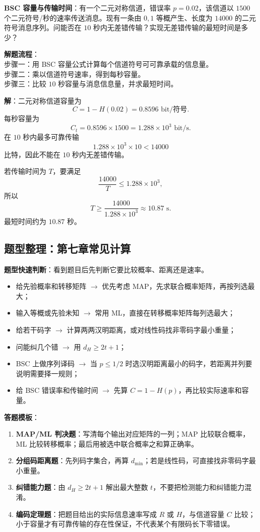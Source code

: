 \begin{example}
\label{ex:ch7-bsc-capacity-time}
\textbf{BSC 容量与传输时间}：有一个二元对称信道，错误率 $p=0.02$，该信道以 $1500$ 个二元符号/秒的速率传送消息。现有一条由 $0,1$ 等概产生、长度为 $14000$ 的二元符号消息序列。问能否在 $10$ 秒内无差错传输？实现无差错传输的最短时间是多少？

\noindent \textbf{解题流程}：\\[2pt]
步骤一：用 BSC 容量公式计算每个信道符号可可靠承载的信息量。\\
步骤二：乘以信道符号速率，得到每秒容量。\\
步骤三：比较 $10$ 秒容量与消息信息量，并求最短时间。

\textbf{解}：二元对称信道容量为
\[
C=1-H(0.02)=0.8596\text{ bit/符号}.
\]
每秒容量为
\[
C_t=0.8596\times1500=1.288\times10^3\text{ bit/s}.
\]
在 $10$ 秒内最多可靠传输
\[
1.288\times10^3\times10<14000
\]
比特，因此不能在 $10$ 秒内无差错传输。

若传输时间为 $T$，要满足
\[
\frac{14000}{T}\le1.288\times10^3,
\]
所以
\[
T\ge\frac{14000}{1.288\times10^3}\approx10.87\text{ s}.
\]
最短时间约为 $10.87$ 秒。
\end{example}

\subsection{题型整理：第七章常见计算}

\textbf{题型快速判断}：看到题目后先判断它要比较概率、距离还是速率。
\begin{itemize}
  \item 给先验概率和转移矩阵 $\to$ 优先考虑 MAP，先求联合概率矩阵，再按列选最大；
  \item 输入等概或先验未知 $\to$ 常用 ML，直接在转移概率矩阵每列选最大；
  \item 给若干码字 $\to$ 计算两两汉明距离，或对线性码找非零码字最小重量；
  \item 问能纠几个错 $\to$ 用 $d_H\ge2t+1$；
  \item BSC 上做序列译码 $\to$ 当 $p\le1/2$ 时选汉明距离最小的码字，若距离并列要说明需要择一规则；
  \item 给 BSC 错误率和传输时间 $\to$ 先算 $C=1-H(p)$，再比较实际速率和容量。
\end{itemize}

\textbf{答题模板}：
\begin{enumerate}
  \item \textbf{MAP/ML 判决题}：写清每个输出对应矩阵的一列；MAP 比较联合概率，ML 比较转移概率；最后用被选中联合概率之和算正确率。
  \item \textbf{分组码距离题}：先列码字集合，再算 $d_{\min}$；若是线性码，可直接找非零码字最小重量。
  \item \textbf{纠错能力题}：由 $d_H\ge2t+1$ 解出最大整数 $t$，不要把检测能力和纠错能力混淆。
  \item \textbf{编码定理题}：把题目给出的实际信息速率写成 $R$ 或 $H$，与信道容量 $C$ 比较；小于容量才有可靠传输的存在性保证，不代表某个有限码长下零错误。
\end{enumerate}

